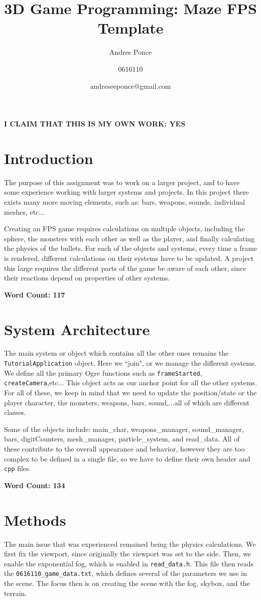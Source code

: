 \documentclass{article}
\author{Andres Ponce \\
	\and
	0616110\\
	\and
	andreseeponce@gmail.com
}
\title{3D Game Programming: Maze FPS Template}
\begin{document}
\maketitle
\textbf{I CLAIM THAT THIS IS MY OWN WORK: YES} 
\section{Introduction}

	The purpose of this assignment was to work on a larger project, and to have some
	experience working with larger systems and projects. In this project there 
	exists many more moving elements, such as: bars, weapons, sounds, individual
	meshes, etc...

	Creating an FPS game requires calculations on multiple objects, including the sphere, 
	the monsters with each other as well as the player, and finally calculating the physics
	of the bullets.  For each of the objects and systems, every time a frame is rendered, 
	different calculations on their systems have to be updated. A project this large requires
	the different parts of the game be aware of each other, since their reactions depend on
	properties of other systems.
	
	\textbf{Word Count: 117}

\section{System Architecture}

	The main system or object which  contains all the other ones remains the \texttt{TutorialApplication} 
	object. Here we ``join", or we manage the different systems. We define all the primary Ogre functions 
	such as \texttt{frameStarted}, \texttt{createCamera},etc... This object acts as our anchor point for
	all the other systems. For all of these, we keep in mind that we 
	need to update the position/state or the player character, the monsters, weapons, bars, sound,...all 
	of which are different classes.

	Some of the objects include: main\_char, weapons\_manager, sound\_manager, bars, digitCounters, mesh\_manager, particle\_system,
	and read\_data. All of these contribute to the overall appearance and behavior, however they are too complex to be
	defined in a single file, so we have to define their own header and \texttt{cpp} files.

	\textbf{Word Count: 134}
\section{Methods}
	The main issue that was experienced remained being the physics calculations. We first fix the viewport, since 
	originally the viewport was set to the side. Then, we enable the exponential fog, which is enabled in 
	\texttt{read\_data.h}. This file then reads the \texttt{0616110\_game\_data.txt}, which defines several of the
	parameters we use in the scene. The focus then is on creating the scene with the fog, skybox, and the terrain. 
\end{document}
